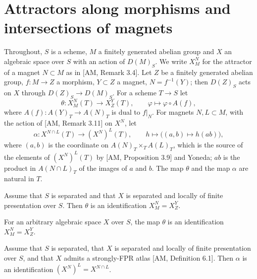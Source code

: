 
\section{Attractors along morphisms and intersections of magnets}

Throughout, $S$ is a scheme, $M$ a finitely generated abelian group and $X$ an algebraic space over $S$ with an action of $D(M)_S$. We write $X^{N}_{M}$ for the attractor of a magnet $N\subset M$ as in [AM, Remark 3.4]. Let $Z$ be a finitely generated abelian group, $f\colon M\to Z$ a morphism, $Y\subset Z$ a magnet, $N=f^{-1}(Y)$; then $D(Z)_S$ acts on $X$ through $D(Z)_S\to D(M)_S$. For a scheme $T\to S$ let
\[
\theta\colon X^{N}_{M}(T)\to X^{Y}_{Z}(T),\qquad \varphi\mapsto\varphi\circ A(f),
\]
where $A(f)\colon A(Y)_T\to A(N)_T$ is dual to $f|_N$. For magnets $N,L\subset M$, with the action of [AM, Remark 3.11] on $X^N$, let
\[
\alpha\colon X^{N\cap L}(T)\to (X^{N})^{L}(T),\qquad h\mapsto\big((a,b)\mapsto h(ab)\big),
\]
where $(a,b)$ is the coordinate on $A(N)_T\times_T A(L)_T$, which is the source of the elements of $(X^N)^L(T)$ by [AM, Proposition 3.9] and Yoneda; $ab$ is the product in $A(N\cap L)_T$ of the images of $a$ and $b$. The map $\theta$ and the map $\alpha$ are natural in $T$.

\begin{theorem}\label{thm:331A}
Assume that $S$ is separated and that $X$ is separated and locally of finite presentation over $S$. Then $\theta$ is an identification $X^{N}_{M}=X^{Y}_{Z}$.
\end{theorem}

\begin{theorem}\label{thm:331B}
For an arbitrary algebraic space $X$ over $S$, the map $\theta$ is an identification $X^{N}_{M}=X^{Y}_{Z}$.
\end{theorem}

\begin{theorem}\label{thm:332A}
Assume that $S$ is separated, that $X$ is separated and locally of finite presentation over $S$, and that $X$ admits a strongly-FPR atlas [AM, Definition 6.1]. Then $\alpha$ is an identification $(X^{N})^{L}=X^{N\cap L}$.
\end{theorem}

